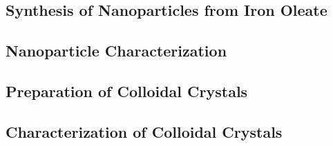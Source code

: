 \documentclass[\main/dresen_thesis.tex]{subfiles}
\renewcommand{\thisPath}{\main/chapters/colloidalCrystals/experimentalMethods/}
\begin{document}
  \subsection{Synthesis of  Nanoparticles from Iron Oleate}
    
      \FloatBarrier

  \subsection{Nanoparticle Characterization}
    
    \FloatBarrier
    \clearpage

  \subsection{Preparation of Colloidal Crystals}
    
    \FloatBarrier

  \subsection{Characterization of Colloidal Crystals}
    
    \FloatBarrier
\end{document}
